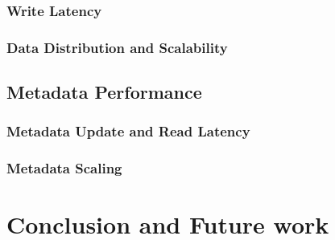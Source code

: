 \documentclass[cjk,slidestop,mathserif]{beamer}
\begin{document}
\begin{CJK}{UTF8}{gkai}
\begin{frame}
\end{frame}

\begin{frame}
 \frametitle{Write Latency}
 
\end{frame}

\begin{frame}
 \frametitle{Data Distribution and Scalability}
 
\end{frame}

\subsection{Metadata Performance}
\begin{frame}
 \frametitle{Metadata Update and Read Latency}
 
\end{frame}

\begin{frame}
 \frametitle{Metadata Scaling}
 
\end{frame}


\section{Conclusion and Future work}
\begin{frame}
 
\end{frame}



\end{CJK}
\end{document}
